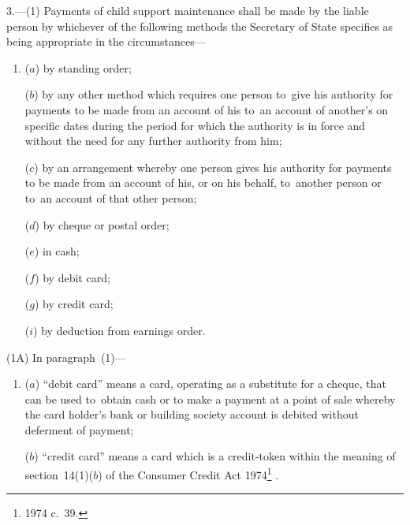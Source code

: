 \documentclass[12pt,a4paper]{article}
\begin{document}
3.—(1) Payments of child support maintenance%
shall be made by the liable person by whichever of the following methods the Secretary of State specifies as being appropriate in the circumstances—
\begin{enumerate}\item[]
($a$) by standing order;

($b$) by any other method which requires one person to~give his authority for payments to be made from an account of his to~an account of another’s on specific dates during the period for which the authority is in force and without the need for any further authority from him;

($c$) by an arrangement whereby one person gives his authority for payments to be made from an account of his, or on his behalf, to~another person or to~an account of that other person;

($d$) by cheque or postal order;

($e$) in cash;

($f$) by debit card;

($g$) by credit card;


($i$) by deduction from earnings order.
\end{enumerate}


(1A) In paragraph~(1)—
\begin{enumerate}\item[]
($a$) “debit card” means a card, operating as a substitute for a cheque, that can be used to~obtain cash or to make a payment at a point of sale whereby the card holder’s bank or building society account is debited without deferment of payment;

($b$) “credit card” means a card which is a credit-token within the meaning of section~14(1)($b$)  of the Consumer Credit Act 1974\footnote{1974 c.~39.}%
%
.
\end{enumerate}
\end{document}
